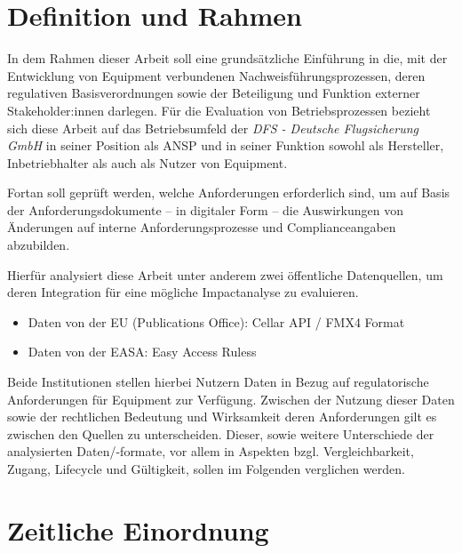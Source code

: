     \pagebreak
    \section{Definition und Rahmen}

        In dem Rahmen dieser Arbeit soll eine grundsätzliche Einführung in die, mit der Entwicklung von \atmans{} Equipment verbundenen Nachweisführungsprozessen, deren regulativen Basisverordnungen sowie der Beteiligung und Funktion externer Stakeholder:innen darlegen.
        Für die Evaluation von Betriebsprozessen bezieht sich diese Arbeit auf das Betriebsumfeld der \textit{DFS - Deutsche Flugsicherung GmbH} in seiner Position als \ac{ANSP} und in seiner Funktion sowohl als Hersteller, Inbetriebhalter als auch als Nutzer von \atmans{} Equipment.

        Fortan soll geprüft werden, welche Anforderungen erforderlich sind, um auf Basis der Anforderungsdokumente -- in digitaler Form -- die Auswirkungen von Änderungen auf interne Anforderungsprozesse und Complianceangaben abzubilden.


        Hierfür analysiert diese Arbeit unter anderem zwei öffentliche Datenquellen, um deren Integration für eine mögliche Impactanalyse zu evaluieren.
        \begin{itemize}
            \item Daten von der EU (Publications Office): Cellar API / FMX4 Format
            \item Daten von der EASA: Easy Access Ruless
        \end{itemize}

        Beide Institutionen stellen hierbei Nutzern Daten in Bezug auf regulatorische Anforderungen für \atmans{} Equipment zur Verfügung.
        Zwischen der Nutzung dieser Daten sowie der rechtlichen Bedeutung und Wirksamkeit deren Anforderungen gilt es zwischen den Quellen zu unterscheiden.
        Dieser, sowie weitere Unterschiede der analysierten Daten/-formate, vor allem in Aspekten bzgl. Vergleichbarkeit, Zugang, Lifecycle und Gültigkeit, sollen im Folgenden verglichen werden.

    
\section{Zeitliche Einordnung}


